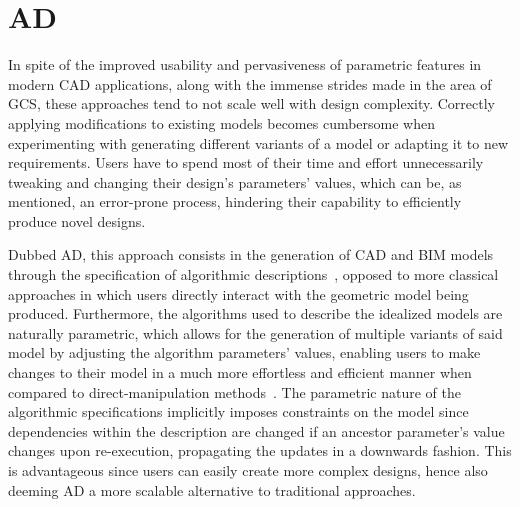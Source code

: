 \section{\acl{AD}}%
\label{sec:intro.ad}

In spite of the improved usability and pervasiveness of parametric features in
modern \ac{CAD} applications, along with the immense strides made in the area of
\ac{GCS}, these approaches tend to not scale well with design complexity.
Correctly applying modifications to existing models becomes cumbersome when
experimenting with generating different variants of a model or adapting it to
new requirements.  Users have to spend most of their time and effort
unnecessarily tweaking and changing their design's parameters' values, which can
be, as mentioned, an error-prone process, hindering their capability to
efficiently produce novel designs.

Dubbed \ac{AD}, this approach consists in the generation of \ac{CAD} and
\ac{BIM} models through the specification of algorithmic
descriptions~\cite{McCormack:2004:GDPDR}, opposed to more classical approaches
in which users directly interact with the geometric model being produced.
Furthermore, the algorithms used to describe the idealized models are naturally
parametric, which allows for the generation of multiple variants of said model
by adjusting the algorithm parameters' values, enabling users to make changes to
their model in a much more effortless and efficient manner when compared to
direct-manipulation methods~\cite{Leitao:2013:PESLGD}.  The parametric nature of
the algorithmic specifications implicitly imposes constraints on the model since
dependencies within the description are changed if an ancestor parameter's value
changes upon re-execution, propagating the updates in a downwards fashion.  This
is advantageous since users can easily create more complex designs, hence also
deeming \ac{AD} a more scalable alternative to traditional approaches.

